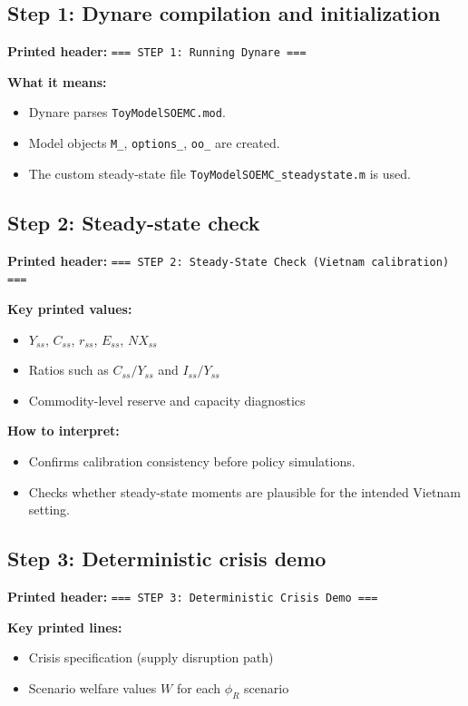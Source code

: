 \documentclass[11pt]{article}
\begin{document}
\subsection*{Step 1: Dynare compilation and initialization}
\textbf{Printed header:} \texttt{=== STEP 1: Running Dynare ===}

\textbf{What it means:}
\begin{itemize}
\item Dynare parses \texttt{ToyModelSOEMC.mod}.
\item Model objects \texttt{M\_}, \texttt{options\_}, \texttt{oo\_} are created.
\item The custom steady-state file \texttt{ToyModelSOEMC\_steadystate.m} is used.
\end{itemize}

\subsection*{Step 2: Steady-state check}
\textbf{Printed header:} \texttt{=== STEP 2: Steady-State Check (Vietnam calibration) ===}

\textbf{Key printed values:}
\begin{itemize}
\item $Y_{ss}$, $C_{ss}$, $r_{ss}$, $E_{ss}$, $NX_{ss}$
\item Ratios such as $C_{ss}/Y_{ss}$ and $I_{ss}/Y_{ss}$
\item Commodity-level reserve and capacity diagnostics
\end{itemize}

\textbf{How to interpret:}
\begin{itemize}
\item Confirms calibration consistency before policy simulations.
\item Checks whether steady-state moments are plausible for the intended Vietnam setting.
\end{itemize}

\subsection*{Step 3: Deterministic crisis demo}
\textbf{Printed header:} \texttt{=== STEP 3: Deterministic Crisis Demo ===}

\textbf{Key printed lines:}
\begin{itemize}
\item Crisis specification (supply disruption path)
\item Scenario welfare values $W$ for each $\phi_R$ scenario
\end{itemize}
\end{document}
